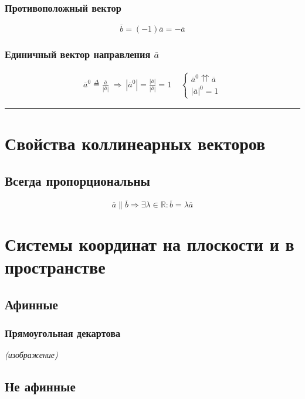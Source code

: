 \documentclass{article}
\begin{document}
\subsubsection{Противоположный вектор}
\[
    \overline{b} = (-1)\overline{a} = -\overline{a}
\]

\subsubsection{Единичный вектор направления $\overline{a}$}
\begin{gather*}
    \overline{a}^0 \overset{\Delta}{=} \frac{\overline{a}}{|\overline{a}|} ~\Rightarrow~
    |\overline{a}^0| = \frac{|\overline{a}|}{|\overline{a}|} = 1 ~~~~~
    \begin{cases}
        \overline{a}^0 \upuparrows \overline{a} \\
        |\overline{a}|^0 = 1
    \end{cases}
\end{gather*}


\par\noindent\rule{\textwidth}{1pt}
\section{Свойства коллинеарных векторов}

\subsection{Всегда пропорциональны}
\[
    \overline{a} \parallel \overline{b} \Rightarrow \exists \lambda \in \mathbb{R}: \overline{b} = \lambda \overline{a}
\]



\section{Системы координат на плоскости и в пространстве}

\subsection{Афинные}

\subsubsection{Прямоугольная декартова}
\textit{(изображение)}


\subsection{Не афинные}
\end{document}
